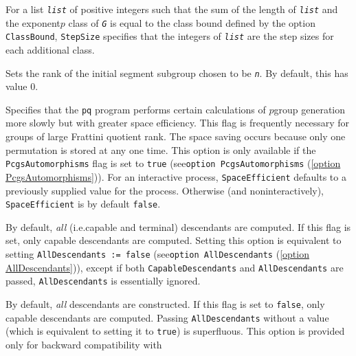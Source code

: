 \documentclass[a4paper,11pt]{report}
\begin{document}
{{\begin{description}
 For a list \mbox{\texttt{\mdseries\slshape list}} of positive integers such that the sum of the length of \mbox{\texttt{\mdseries\slshape list}} and the exponent\texttt{}$p$ class of \mbox{\texttt{\mdseries\slshape G}} is equal to the class bound defined by the option \texttt{ClassBound}, \texttt{StepSize} specifies that the integers of \mbox{\texttt{\mdseries\slshape list}} are the step sizes for each additional class. 
\item[{\texttt{RankInitialSegmentSubgroups := \mbox{\texttt{\mdseries\slshape n}}} \label{option RankInitialSegmentSubgroups}\index{option RankInitialSegmentSubgroups}}]  Sets the rank of the initial segment subgroup chosen to be \mbox{\texttt{\mdseries\slshape n}}. By default, this has value 0. 
\item[{\texttt{SpaceEfficient} \label{option SpaceEfficient}\index{option SpaceEfficient}}]  Specifies that the \texttt{pq} program performs certain calculations of $p$\texttt{}group generation more slowly but with greater space
efficiency. This flag is frequently necessary for groups of large Frattini
quotient rank. The space saving occurs because only one permutation is stored
at any one time. This option is only available if the \texttt{PcgsAutomorphisms} flag is set to \texttt{true} (see{\nobreakspace}\texttt{option PcgsAutomorphisms} (\ref{option PcgsAutomorphisms})). For an interactive process, \texttt{SpaceEfficient} defaults to a previously supplied value for the process. Otherwise (and
non\texttt{}interactively), \texttt{SpaceEfficient} is by default \texttt{false}. 
\item[{\texttt{CapableDescendants} \label{option CapableDescendants}\index{option CapableDescendants}}]  By default, \emph{all} (i.e.{\nobreakspace}capable and terminal) descendants are computed. If this
flag is set, only capable descendants are computed. Setting this option is
equivalent to setting \texttt{AllDescendants := false} (see{\nobreakspace}\texttt{option AllDescendants} (\ref{option AllDescendants})), except if both \texttt{CapableDescendants} and \texttt{AllDescendants} are passed, \texttt{AllDescendants} is essentially ignored. 
\item[{\texttt{AllDescendants := false} \label{option AllDescendants}\index{option AllDescendants}}]  By default, \emph{all} descendants are constructed. If this flag is set to \texttt{false}, only capable descendants are computed. Passing \texttt{AllDescendants} without a value (which is equivalent to setting it to \texttt{true}) is superfluous. This option is provided only for backward compatibility with

\end{description}}}
\end{document}
